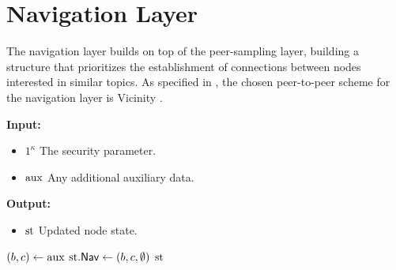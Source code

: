 \section{Navigation Layer}
\label{sec:navigation}

The navigation layer builds on top of the peer-sampling layer, building a structure that prioritizes the establishment of connections between nodes interested in similar topics. As specified in \cite{akv24}, the chosen peer-to-peer scheme for the navigation layer is Vicinity \cite{vs13}.

\begin{algorithm}[H]
\caption{\navsetup}
\label{alg:navsetup}
\textbf{Input:}
\begin{itemize}
\vspace{-.8em}
\itemsep0em 
    \item $1^\kappa$ The security parameter.
    \item $\text{aux}$ Any additional auxiliary data.
\end{itemize}
\textbf{Output:}
\begin{itemize}
\vspace{-.8em}
\itemsep0em 
    \item $\text{st}$ Updated node state.
\end{itemize}
\begin{algorithmic}
    \State $(b,c) \gets \text{aux}$
    \State $\text{st}.\mathsf{Nav} \gets (b,c,\emptyset)$
    \State \return $\text{st}$
\end{algorithmic}
\end{algorithm}

